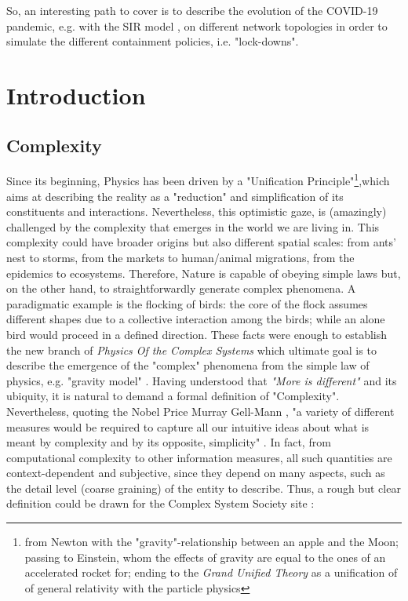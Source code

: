 \documentclass[a4paper,12pt,twoside]{book} %
\theoremstyle{definition}
\begin{document}
So, an interesting path to cover is to describe the evolution of the COVID-19 pandemic, e.g. with the SIR model \cite{pizzuti::2020_ItalyCOVIDnetwork}, on different network topologies in order to simulate the different containment policies, i.e. "lock-downs".


\chapter[Introduction]{Introduction}
%

\section{Complexity}
Since its beginning, Physics has been driven by a "Unification Principle"\footnote{from Newton with the "gravity"-relationship between an apple and the Moon; passing to Einstein, whom the effects of gravity are equal to the ones of an accelerated rocket for; ending to the \textit{Grand Unified Theory} as a unification of of general relativity with the particle physics},which aims at describing the reality as a "reduction" and simplification of its constituents and interactions. Nevertheless, this optimistic gaze, is (amazingly) challenged by the complexity that emerges in the world we are living in. This complexity could have broader origins but also different spatial scales: from ants' nest to storms, from the markets to human/animal migrations, from the epidemics to ecosystems. Therefore, Nature is capable of obeying simple laws but, on the other hand, to straightforwardly generate complex phenomena. A paradigmatic example is the flocking of birds: the core of the flock assumes different shapes due to a collective interaction among the birds; while an alone bird would proceed in a defined direction.
These facts were enough to establish the new branch of \textit{Physics Of the Complex Systems} which ultimate goal is to describe the emergence of the "complex" phenomena from the simple law of physics, e.g. "gravity model" \cite{GravityModelsandEmpiricalTrade}.
Having understood that \textit{"More is different"} \cite{Anderson:1972_MoreIsDifferent} and its ubiquity, it is natural to demand a formal definition of "Complexity". Nevertheless, quoting the Nobel Price Murray Gell-Mann \cite{Gell-Man:1987_S&C}, "a variety of different measures would be required to capture all our intuitive ideas about what is meant by complexity and by its opposite, simplicity" . In fact, from computational complexity to other information measures, all such quantities are context-dependent and subjective, since they depend on many aspects, such as the detail level (coarse graining) of the entity to describe. Thus, a rough but clear definition could be drawn for the Complex System Society site \cite{CSS:2021_compsystdef}:
\end{document}
